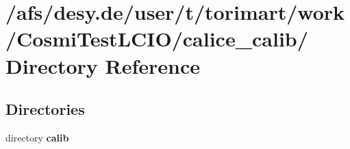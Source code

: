 \section{/afs/desy.de/user/t/torimart/work/CosmiTestLCIO/calice\_\-calib/ Directory Reference}
\label{dir_5116c8f7e4b5645f509e1533a2a6cce8}
\subsection*{Directories}
\begin{DoxyCompactItemize}
\item 
directory {\bf calib}
\end{DoxyCompactItemize}
